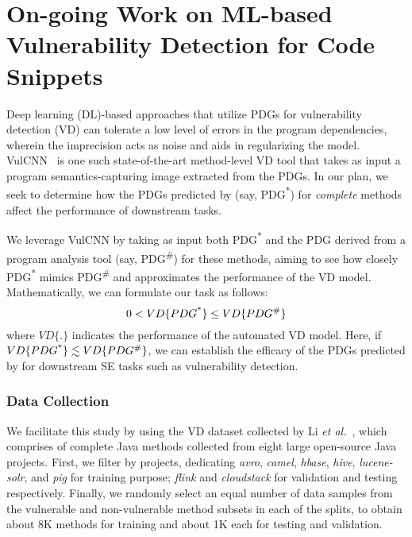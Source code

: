 \section{On-going Work on ML-based Vulnerability Detection for Code Snippets}
\label{sec:vd}




Deep learning (DL)-based approaches that utilize PDGs for
vulnerability detection (VD) can tolerate a low level of errors in the
program dependencies, wherein the imprecision acts as noise and aids
in regularizing the model. VulCNN~\cite{wu2022vulcnn} is one such
state-of-the-art method-level VD tool that takes as input a program
semantics-capturing image extracted from the PDGs. In our plan,
we seek to determine how the PDGs predicted by \tool (say,
PDG\textsuperscript{*}) for {\em complete} methods affect the
performance of downstream tasks.


We leverage VulCNN by taking as input both PDG\textsuperscript{*} and
the PDG derived from a program analysis tool (say,
PDG\textsuperscript{\#}) for these methods, aiming to see how closely
PDG\textsuperscript{*} mimics PDG\textsuperscript{\#} and approximates
the performance of the VD model. Mathematically, we can formulate our
task as follows:
\begin{equation}
    \centering
    0 < VD\{PDG\textsuperscript{*}\} \leq VD\{PDG\textsuperscript{\#}\}
\end{equation}
where $VD\{.\}$ indicates the performance of the automated VD model. Here, if $VD\{PDG\textsuperscript{*}\} \lesssim VD\{PDG\textsuperscript{\#}\}$, we can establish the efficacy of the PDGs predicted by \tool for downstream SE tasks such as vulnerability detection.


\subsubsection*{\bf Data Collection}
We facilitate this study by using the VD dataset collected by Li {\em
  et al.}~\cite{yioopsla19}, which comprises of
complete Java methods collected from eight large
open-source Java projects. First, we filter by projects, dedicating
\textit{avro}, \textit{camel}, \textit{hbase}, \textit{hive},
\textit{lucene-solr}, and \textit{pig} for training purpose;
\textit{flink} and \textit{cloudstack} for validation and testing
respectively.
Finally, we randomly select an equal number of data samples from the
vulnerable and non-vulnerable method subsets in each of the splits, to
obtain about 8K methods for training and about 1K each for testing and
validation.

